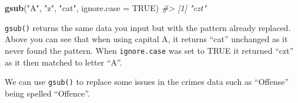 \documentclass[
  12pt,
]{book}
\newenvironment{Shaded}{\begin{snugshade}}{\end{snugshade}}
\newcommand{\CommentTok}[1]{\textcolor[rgb]{0.37,0.37,0.37}{\textit{#1}}}
\newcommand{\DataTypeTok}[1]{\textcolor[rgb]{0.27,0.27,0.27}{#1}}
\newcommand{\KeywordTok}[1]{\textcolor[rgb]{0.27,0.27,0.27}{\textbf{#1}}}
\newcommand{\NormalTok}[1]{#1}
\newcommand{\OtherTok}[1]{\textcolor[rgb]{0.37,0.37,0.37}{#1}}
\newcommand{\StringTok}[1]{\textcolor[rgb]{0.5,0.5,0.5}{#1}}
\begin{document}
\begin{Shaded}
\begin{Highlighting}[]
\KeywordTok{gsub}\NormalTok{(}\StringTok{"A"}\NormalTok{, }\StringTok{"z"}\NormalTok{, }\StringTok{"cat"}\NormalTok{, }\DataTypeTok{ignore.case =} \OtherTok{TRUE}\NormalTok{)}
\CommentTok{\#\textgreater{} [1] "czt"}
\end{Highlighting}
\end{Shaded}

\texttt{gsub()} returns the same data you input but with the pattern already replaced. Above you can see that when using capital A, it returns ``cat'' unchanged as it never found the pattern. When \texttt{ignore.case} was set to TRUE it returned ``czt'' as it then matched to letter ``A''.

We can use \texttt{gsub()} to replace some issues in the crimes data such as ``Offense'' being spelled ``Offence''.
\end{document}

